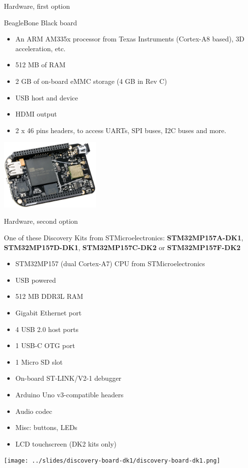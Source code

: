 \documentclass[a4paper,12pt,obeyspaces,spaces,hyphens]{article}
\begin{document}
\feagendatwocolumn
{Hardware, first option}
{
  BeagleBone Black board
  \begin{itemize}
  \item An ARM AM335x processor from Texas Instruments (Cortex-A8
    based), 3D acceleration, etc.
  \item 512 MB of RAM
  \item 2 GB of on-board eMMC storage
        \newline(4 GB in Rev C)
  \item USB host and device
  \item HDMI output
  \item 2 x 46 pins headers, to access UARTs, SPI buses, I2C buses
    and more.
  \end{itemize}

}{}
{
  \begin{center}
    \includegraphics[width=5cm]{../slides/beagleboneblack-board/beagleboneblack.png}
  \end{center}
}

\feagendatwocolumn
{Hardware, second option}
{
  One of these Discovery Kits from STMicroelectronics: {\bf
  STM32MP157A-DK1}, {\bf STM32MP157D-DK1}, {\bf STM32MP157C-DK2} or
  {\bf STM32MP157F-DK2}
  \begin{itemize}
  \item STM32MP157 (dual Cortex-A7) CPU from STMicroelectronics
  \item USB powered
  \item 512 MB DDR3L RAM
  \item Gigabit Ethernet port
  \item 4 USB 2.0 host ports
  \item 1 USB-C OTG port
  \item 1 Micro SD slot
  \item On-board ST-LINK/V2-1 debugger
  \item Arduino Uno v3-compatible headers
  \item Audio codec
  \item Misc: buttons, LEDs
  \item LCD touchscreen (DK2 kits only)
  \end{itemize}
}{}
{
  \begin{center}
    \texttt{[image: ../slides/discovery-board-dk1/discovery-board-dk1.png]}
  \end{center}
}
\end{document}

